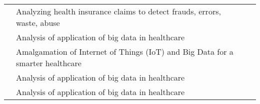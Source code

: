 \begin{center}
\begin{tabular}{|p{6cm}|p{6cm}|p{1cm}|}
        \cite{Srinivasan2013}      & Analyzing health insurance claims to detect frauds, errors, waste, abuse            &                                             \\

        \cite{Mehta2018}           & Analysis of application of big data in healthcare                                   &                                             \\

        \cite{firouzi2018internet} & Amalgamation of Internet of Things (IoT) and Big Data for a smarter healthcare      &                                             \\

        \cite{firouzi2018internet} & Analysis of application of big data in healthcare                                   &                                             \\

        \cite{Chen2018}            & Analysis of application of big data in healthcare                                   &                                             \\

        \hline
    \end{tabular}
\end{center}


